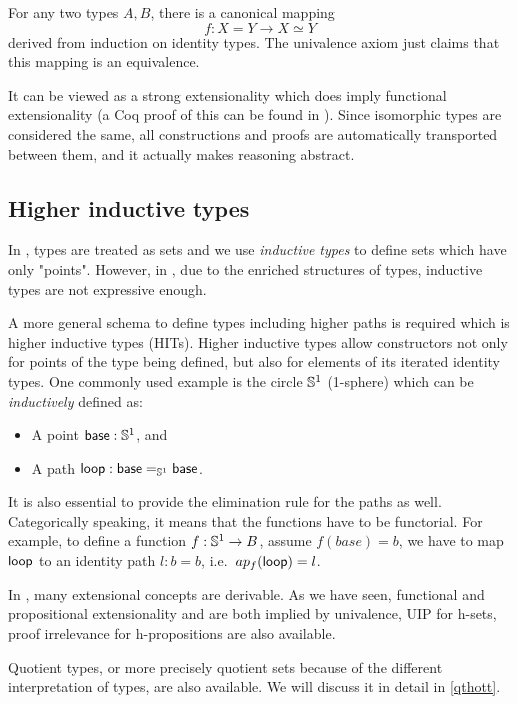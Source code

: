 For any two types $A, B$, there is a canonical mapping $$f : X = Y \to X \simeq Y$$ derived from induction on identity types. The univalence axiom just claims that this mapping is an equivalence. 


It can be viewed as a strong extensionality which does imply functional extensionality (a Coq proof of this can be found in \cite{uafe}). 
Since isomorphic types are considered the same, all constructions and proofs are automatically transported between them, and it actually makes reasoning abstract.


\subsection{Higher inductive types}\label{HITs}

In \itt, types are treated as sets and we use \emph{inductive types} to define sets which have only "points". However, in \hott, due to the enriched structures of types, inductive types are not expressive enough.

A more general schema to define types including higher paths is required which is higher inductive types (HITs). Higher inductive types allow constructors not only for points of the type being defined, but also for elements of its iterated identity types.
One commonly used example is the circle $\Sn^1$ (1-sphere) which can be \emph{inductively} defined as:

\begin{itemize}
\item A point $\base:\Sn^1$, and
\item A path $\lloop : {\id[\Sn^1]\base\base}$.
\end{itemize}

It is also essential to provide the elimination rule for the paths as well. Categorically speaking, it means that the functions have to be functorial. For example, to define a function $f :\Sn^1 \rightarrow B$, assume $f(base)=b$, we have to map $\lloop$ to an identity path $l : b = b$, i.e.\ $ap_{f}(\lloop)=l$.


In \hott, many extensional concepts are derivable. As we have seen, functional and propositional extensionality and are both implied by univalence, UIP for h-sets, proof irrelevance for h-propositions are also available.

Quotient types, or more precisely quotient sets because of the different interpretation of types, are also available. We will discuss it in detail in \autoref{qthott}.

